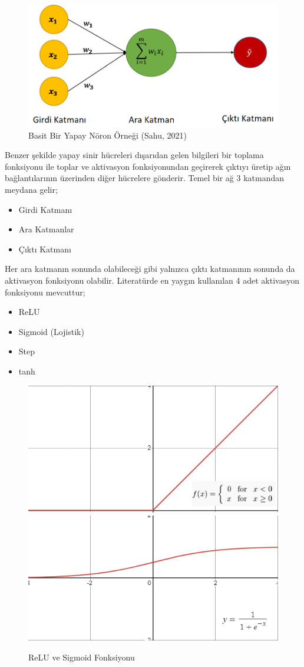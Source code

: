 \documentclass[12pt,twoside]{deuthesis}
\begin{document}
\begin{figure}

{\centering \includegraphics[width=0.8\linewidth,height=0.3\textheight]{figure/basic_neuron} 

}

\caption{Basit Bir Yapay Nöron Örneği (Sahu, 2021)}\label{fig:unnamed-chunk-10}
\end{figure}
Benzer şekilde yapay sinir hücreleri dışarıdan gelen bilgileri bir toplama fonksiyonu ile toplar ve aktivasyon fonksiyonundan geçirerek çıktıyı üretip ağın bağlantılarının üzerinden diğer hücrelere gönderir. Temel bir ağ 3 katmandan meydana gelir;
\begin{itemize}
\item
  Girdi Katmanı
\item
  Ara Katmanlar
\item
  Çıktı Katmanı
\end{itemize}
Her ara katmanın sonunda olabileceği gibi yalnızca çıktı katmanının sonunda da aktivasyon fonksiyonu olabilir. Literatürde en yaygın kullanılan 4 adet aktivasyon fonksiyonu mevcuttur;
\begin{itemize}
\item
  ReLU
\item
  Sigmoid (Lojistik)
\item
  Step
\item
  tanh
\end{itemize}
\begin{figure}

{\centering \includegraphics[width=0.49\linewidth,height=0.18\textheight]{figure/relu} \includegraphics[width=0.49\linewidth,height=0.18\textheight]{figure/sigmoid} 

}

\caption{ReLU ve Sigmoid Fonksiyonu}\label{fig:unnamed-chunk-11}
\end{figure}
\end{document}
